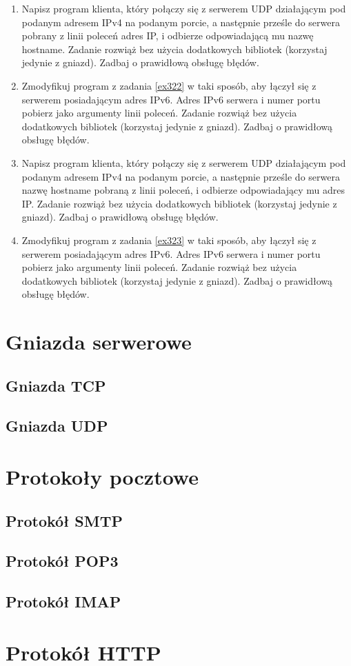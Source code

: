 \documentclass{article}
\begin{document}
\begin{enumerate}[label=\textbf{3.\arabic*}, resume]
\item \label{ex322} Napisz program klienta, który połączy się z serwerem UDP działającym pod podanym adresem IPv4 na podanym porcie, a następnie prześle do serwera pobrany z linii poleceń adres IP, i odbierze odpowiadającą mu nazwę hostname. Zadanie rozwiąż bez użycia dodatkowych bibliotek (korzystaj jedynie z gniazd). Zadbaj o prawidłową obsługę błędów. 

\item  Zmodyfikuj program z zadania \ref{ex322} w taki sposób,  aby łączył się z serwerem posiadającym adres IPv6. Adres IPv6 serwera i numer portu pobierz jako argumenty linii poleceń. Zadanie rozwiąż bez użycia dodatkowych bibliotek (korzystaj jedynie z gniazd). Zadbaj o prawidłową obsługę błędów. 

\item \label{ex323} Napisz program klienta, który połączy się z serwerem UDP działającym pod podanym adresem IPv4 na podanym porcie, a następnie prześle do serwera nazwę hostname pobraną z linii poleceń, i odbierze odpowiadający mu adres IP.  Zadanie rozwiąż bez użycia dodatkowych bibliotek (korzystaj jedynie z gniazd). Zadbaj o prawidłową obsługę błędów. 

\item Zmodyfikuj program z zadania \ref{ex323} w taki sposób,  aby łączył się z serwerem posiadającym adres IPv6. Adres IPv6 serwera i numer portu pobierz jako argumenty linii poleceń. Zadanie rozwiąż bez użycia dodatkowych bibliotek (korzystaj jedynie z gniazd). Zadbaj o prawidłową obsługę błędów. 
\end{enumerate}

\newpage
\section{Gniazda serwerowe}

\subsection*{Gniazda TCP}
\subsection*{Gniazda UDP}

\section{Protokoły pocztowe}
\subsection{Protokół SMTP}
\subsection{Protokół POP3}
\subsection{Protokół IMAP}

\section{Protokół HTTP}

\newpage 

\end{document}
